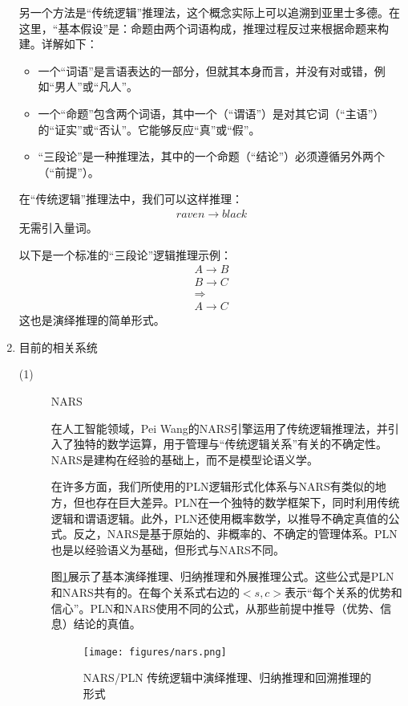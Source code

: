 \begin{enumerate}
另一个方法是“传统逻辑”推理法，这个概念实际上可以追溯到亚里士多德。在这里，“基本假设”是：命题由两个词语构成，推理过程反过来根据命题来构建。详解如下：

\begin{itemize}
\item 一个“词语”是言语表达的一部分，但就其本身而言，并没有对或错，例如“男人”或“凡人”。
\item 一个“命题”包含两个词语，其中一个（“谓语”）是对其它词（“主语”）的“证实”或“否认”。它能够反应“真”或“假”。
\item “三段论”是一种推理法，其中的一个命题（“结论”）必须遵循另外两个（“前提”）。
\end{itemize}

在“传统逻辑”推理法中，我们可以这样推理：
\begin{eqnarray*}
raven \rightarrow black
\end{eqnarray*}
无需引入量词。

以下是一个标准的“三段论”逻辑推理示例：
\begin{eqnarray*}
A \rightarrow B \\
B \rightarrow C \\
\Rightarrow \\
A \rightarrow C
\end{eqnarray*}
这也是演绎推理的简单形式。

\item{目前的相关系统}

\begin{description}

\item[(1)] NARS

在人工智能领域，Pei Wang的NARS引擎运用了传统逻辑推理法\cite{Wang2006}，并引入了独特的数学运算，用于管理与“传统逻辑关系”有关的不确定性。NARS是建构在经验的基础上，而不是模型论语义学。

在许多方面，我们所使用的PLN逻辑形式化体系与NARS有类似的地方，但也存在巨大差异。PLN在一个独特的数学框架下，同时利用传统逻辑和谓语逻辑。此外，PLN还使用概率数学，以推导不确定真值的公式。反之，NARS是基于原始的、非概率的、不确定的管理体系。PLN也是以经验语义为基础，但形式与NARS不同。


图\ref{fig:nars}展示了基本演绎推理、归纳推理和外展推理公式。这些公式是PLN和NARS共有的。在每个关系式右边的$<s,c>$表示“每个关系的优势和信心”。PLN和NARS使用不同的公式，从那些前提中推导（优势、信息）结论的真值。

\begin{figure}[htb]
\centering
\texttt{[image: figures/nars.png]}
\caption{ NARS/PLN 传统逻辑中演绎推理、归纳推理和回溯推理的形式 }
\label{fig:nars}
\end{figure}


\end{description}
\end{enumerate}
